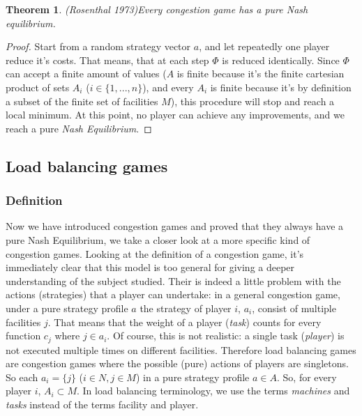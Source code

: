 \documentclass[a4paper,11pt]{article}
\newtheorem{theorem}{Theorem}[section]
\begin{document}
\begin{theorem}(Rosenthal 1973)\cite{7}\label{rosenthal}
Every congestion game has a pure Nash equilibrium.
\end{theorem}

\begin{proof}
Start from a random strategy vector $a$, and let repeatedly one player reduce it's costs. That means, that at each step $\Phi$ is reduced identically. Since $\Phi$ can accept a finite amount of values ($A$ is finite because it's the finite cartesian product of sets $A_i$ ($i \in \{1,...,n\}$), and every $A_i$ is finite because it's by definition a subset of the finite set of facilities $M$), this procedure will stop and reach a local minimum. At this point, no player can achieve any improvements, and we reach a pure \emph{Nash Equilibrium}.
\end{proof}



\subsection{Load balancing games}
\subsubsection{Definition}
Now we have introduced congestion games and proved that they always have a pure Nash Equilibrium, we take a closer look at a more specific kind of congestion games. Looking at the definition of a congestion game, it's immediately clear that this model is too general for giving a deeper understanding of the subject studied. Their is indeed a little problem with the actions (strategies) that a player can undertake: in a general congestion game, under a pure strategy profile $a$ the strategy of player $i$, $a_i$, consist of multiple facilities $j$. That means that the weight of a player (\emph{task}) counts for every function $c_j$ where $j \in a_i$. Of course, this is not realistic: a single task (\emph{player}) is not executed multiple times on different facilities. Therefore load balancing games are congestion games where the possible (pure) actions of players are singletons. So each $a_i = \{j\}$ ($i \in N, j \in M$) in a pure strategy profile $a \in A$. So, for every player $i$, $A_i \subset M$. In load balancing terminology, we use the terms \emph{machines} and \emph{tasks} instead of the terms facility and player.
\end{document}
